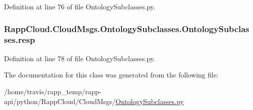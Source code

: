 Definition at line 76 of file Ontology\-Subclasses.\-py.

\hypertarget{classRappCloud_1_1CloudMsgs_1_1OntologySubclasses_1_1OntologySubclasses_a6518b5b3e353a7592456987104b4a21e}{
\subsubsection[{resp}]{\setlength{\rightskip}{0pt plus 5cm}Rapp\-Cloud.\-Cloud\-Msgs.\-Ontology\-Subclasses.\-Ontology\-Subclasses.\-resp}}\label{classRappCloud_1_1CloudMsgs_1_1OntologySubclasses_1_1OntologySubclasses_a6518b5b3e353a7592456987104b4a21e}


Definition at line 78 of file Ontology\-Subclasses.\-py.



The documentation for this class was generated from the following file\-:\begin{DoxyCompactItemize}
\item 
/home/travis/rapp\-\_\-temp/rapp-\/api/python/\-Rapp\-Cloud/\-Cloud\-Msgs/\hyperlink{OntologySubclasses_8py}{Ontology\-Subclasses.\-py}\end{DoxyCompactItemize}
